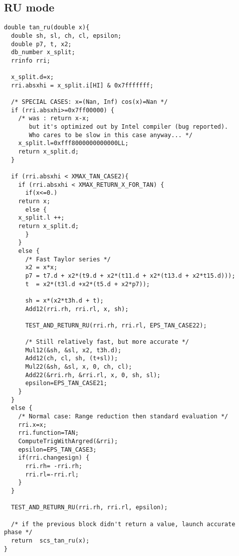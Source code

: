 \subsection{RU mode}
\begin{lstlisting}[caption={Exceptional cases for tangent RU},firstnumber=1]
double tan_ru(double x){  
  double sh, sl, ch, cl, epsilon;
  double p7, t, x2;
  db_number x_split;
  rrinfo rri;

  x_split.d=x;
  rri.absxhi = x_split.i[HI] & 0x7fffffff;
  
  /* SPECIAL CASES: x=(Nan, Inf) cos(x)=Nan */
  if (rri.absxhi>=0x7ff00000) {
    /* was : return x-x; 
       but it's optimized out by Intel compiler (bug reported).
       Who cares to be slow in this case anyway... */
    x_split.l=0xfff8000000000000LL;
    return x_split.d;
  }   
  
  if (rri.absxhi < XMAX_TAN_CASE2){
    if (rri.absxhi < XMAX_RETURN_X_FOR_TAN) {
      if(x<=0.)
	return x;
      else {
	x_split.l ++;
	return x_split.d;
      }
    }
    else {
      /* Fast Taylor series */
      x2 = x*x;
      p7 = t7.d + x2*(t9.d + x2*(t11.d + x2*(t13.d + x2*t15.d)));
      t  = x2*(t3l.d +x2*(t5.d + x2*p7));
    
      sh = x*(x2*t3h.d + t);
      Add12(rri.rh, rri.rl, x, sh);   
      
      TEST_AND_RETURN_RU(rri.rh, rri.rl, EPS_TAN_CASE22);

      /* Still relatively fast, but more accurate */
      Mul12(&sh, &sl, x2, t3h.d);
      Add12(ch, cl, sh, (t+sl));
      Mul22(&sh, &sl, x, 0, ch, cl);
      Add22(&rri.rh, &rri.rl, x, 0, sh, sl);
      epsilon=EPS_TAN_CASE21; 
    }
  }
  else { 
    /* Normal case: Range reduction then standard evaluation */
    rri.x=x;
    rri.function=TAN;
    ComputeTrigWithArgred(&rri);
    epsilon=EPS_TAN_CASE3; 
    if(rri.changesign) {
      rri.rh= -rri.rh; 
      rri.rl=-rri.rl;
    }
  }
  
  TEST_AND_RETURN_RU(rri.rh, rri.rl, epsilon);

  /* if the previous block didn't return a value, launch accurate phase */
  return  scs_tan_ru(x);
}
\end{lstlisting}

